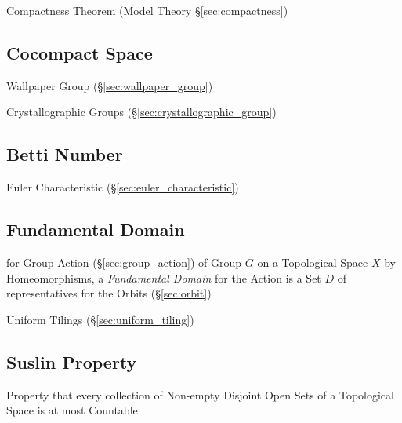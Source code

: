 Compactness Theorem (Model Theory \S\ref{sec:compactness})



\subsection{Cocompact Space}\label{sec:cocompact_space}

Wallpaper Group (\S\ref{sec:wallpaper_group})

Crystallographic Groups (\S\ref{sec:crystallographic_group})



\subsection{Betti Number}\label{sec:betti_number}

Euler Characteristic (\S\ref{sec:euler_characteristic})



\subsection{Fundamental Domain}\label{sec:fundamental_domain}

for Group Action (\S\ref{sec:group_action}) of Group $G$ on a Topological Space
$X$ by Homeomorphisms, a \emph{Fundamental Domain} for the Action is a Set $D$
of representatives for the Orbits (\S\ref{sec:orbit})

Uniform Tilings (\S\ref{sec:uniform_tiling})



\subsection{Suslin Property}\label{sec:suslin_property}

Property that every collection of Non-empty Disjoint Open Sets of a Topological
Space is at most Countable



